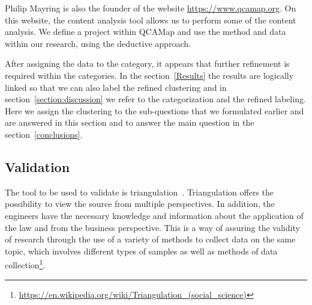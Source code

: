 Philip Mayring is also the founder of the website \url{https://www.qcamap.org}.
On this website, the content analysis tool allows us to perform some of the content analysis.
We define a project within QCAMap and use the method and data within our research, using the deductive approach.

After assigning the data to the category, it appears that further refinement is required within the categories.
In the section~\ref{Results} the results are logically linked so that we can also label the refined clustering and in section~\ref{section:discussion} we refer to the categorization and the refined labeling.
Here we assign the clustering to the sub-questions that we formulated earlier and are answered in this section and to answer the main question in the section~\ref{conclusions}.

\subsection{Validation}\label{subsection:validation}
The tool to be used to validate is triangulation~\citep{carter_use_2014, farquhar_triangulation_2020, runeson_guidelines_2008}.
Triangulation offers the possibility to view the source from multiple perspectives.
In addition, the engineers have the necessary knowledge and information about the application of the law and from the business perspective.
This is a way of assuring the validity of research through the use of a variety of methods to collect data on the same topic, which involves different types of samples as well as methods of data collection\footnote{\url{https://en.wikipedia.org/wiki/Triangulation_(social_science)}}.

